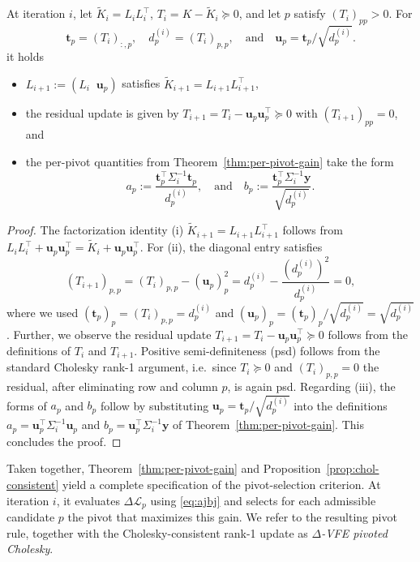 \documentclass[onefignum,onetabnum]{siamart250211}
\begin{document}
\begin{proposition}
\label{prop:chol-consistent}
At iteration $i$, let $\widetilde{K}_i = L_i L_i^\top$, $T_i = K - \widetilde{K}_i \succeq 0$,
and let $p$ satisfy $(T_i)_{pp} > 0$. For
\begin{equation*}
    \label{eq:chol-direction}
    \bm{t}_p  = (T_i)_{:,p}, \quad
    d_p^{(i)} = (T_i)_{p,p}, 
    \quad
    \text{and}
    \quad
    \bm{u}_p = \bm{t}_p / \sqrt{{d}_p^{(i)}}.
\end{equation*}
it holds 
\begin{itemize}
    \item[(i)] $L_{i+1} := (L_i \;\; \bm{u}_p)$ satisfies $\widetilde{K}_{i+1} = L_{i+1}L_{i+1}^\top$,
    \item[(ii)] the residual update is given by $T_{i+1} = T_i - \bm{u}_p \bm{u}_p^\top \succeq 0$ with $(T_{i+1})_{pp} = 0$, and
    \item[(iii)] the per-pivot quantities from Theorem~\ref{thm:per-pivot-gain} take the form
    \begin{equation}
    \label{eq:ajbj}
        a_p := \frac{\bm{t}_p^\top \Sigma_i^{-1} \bm{t}_p}{{d}_p^{(i)}},
        \quad
        \text{and}
        \quad
        b_p := \frac{\bm{t}_p^\top \Sigma_i^{-1} \bm{y}}{\sqrt{{d}_p^{(i)}}}.
    \end{equation}
\end{itemize} 
\end{proposition}
\begin{proof}
    The factorization identity (i) $\widetilde{K}_{i+1}=L_{i+1}L_{i+1}^\top$ follows from $L_i L_i^\top + \bm{u}_p \bm{u}_p^\top = \widetilde{K}_i +  \bm{u}_p \bm{u}_p^\top$. For (ii), the diagonal entry satisfies
    \begin{equation*}
        (T_{i+1})_{p,p}
        = (T_i)_{p,p} - \left(\bm{u}_p\right)_p^2
        = {d}_p^{(i)} - \frac{\left({d}_p^{(i)}\right)^2}{{d}_p^{(i)}}
        = 0,
    \end{equation*}
    where we used $(\bm{t}_p)_p = (T_i)_{p,p} = {d}_p^{(i)}$ and $(\bm{u}_p)_p = (\bm{t}_p)_p / \sqrt{{d}_p^{(i)}} = \sqrt{{d}_p^{(i)}}$. Further, we observe the residual update $T_{i+1} = T_i -\bm{u}_p \bm{u}_p^\top \succeq 0$ follows from the definitions of $T_i$ and $T_{i+1}$. Positive semi-definiteness (psd) follows from the standard Cholesky rank-1 argument, i.e.~since $T_i \succeq0$ and $(T_i)_{p,p} = 0$ the residual, after eliminating row and column $p$, is again psd. Regarding (iii), the forms of $a_p$ and $b_p$ follow by substituting $\bm{u}_p = \bm{t}_p/\sqrt{{d}_p^{(i)}}$ into the definitions $a_p = \bm{u}_p^\top \Sigma_i^{-1} \bm{u}_p$ and $b_p = \bm{u}_p^\top \Sigma_i^{-1} \bm{y}$ of Theorem~\ref{thm:per-pivot-gain}. This concludes the proof.
\end{proof}
Taken together, Theorem~\ref{thm:per-pivot-gain} and Proposition~\ref{prop:chol-consistent} yield a complete specification of the pivot-selection criterion. At iteration $i$, it evaluates $\Delta\mathcal{L}_p$ using \eqref{eq:ajbj} and selects for each admissible candidate $p$ the pivot that maximizes this gain. We refer to the resulting pivot rule, together with the Cholesky-consistent rank-1 update as \textit{$\Delta$-VFE pivoted Cholesky}.
\end{document}
